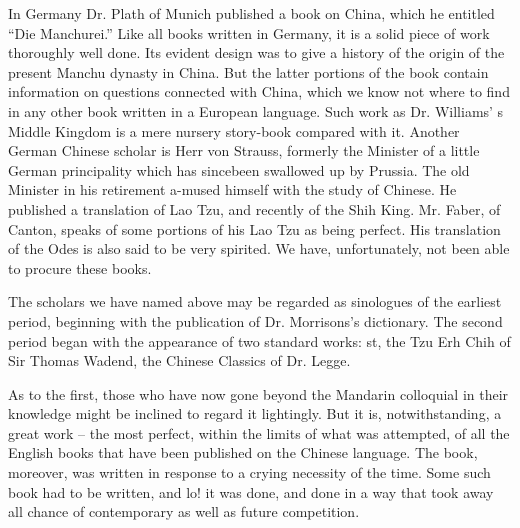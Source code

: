 In Germany Dr. Plath of Munich published a book on China, which he entitled ``Die Manchurei.''
Like all books written in Germany, it is a solid piece of work thoroughly well done.
Its evident design was to give a history of the origin of the present Manchu dynasty in China.
But the latter portions of the book contain information on questions connected with China,
which we know not where to find in any other book written in a European language.
Such work as Dr. Williams' s Middle Kingdom is a mere nursery story-book compared with it.
Another German Chinese scholar is Herr von Strauss, formerly the Minister of a little German principality which has sincebeen swallowed up by Prussia.
The old Minister in his retirement a-mused himself with the study of Chinese.
He published a translation of Lao Tzu, and recently of the Shih King.
Mr. Faber, of Canton, speaks of some portions of his Lao Tzu as being perfect.
His translation of the Odes is also said to be very spirited.
We have, unfortunately, not been able to procure these books.

The scholars we have named above may be regarded as sinologues of the earliest period,
beginning with the publication of Dr. Morrisons's dictionary.
The second period began with the appearance of two standard works:
st, the Tzu Erh Chih of Sir Thomas Wadend, the Chinese Classics of Dr. Legge.

As to the first, those who have now gone beyond the Mandarin colloquial in their knowledge
might be inclined to regard it lightingly.
But it is, notwithstanding, a great work
-- the most perfect, within the limits of what was attempted,
of all the English books that have been published on the Chinese language.
The book, moreover, was written in response to a crying necessity of the time.
Some such book had to be written, and lo! it was done,
and done in a way that took away all chance of contemporary as well as future competition.

